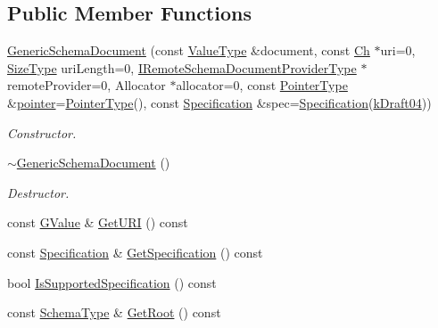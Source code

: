 \subsection*{Public Member Functions}
\begin{DoxyCompactItemize}
\item 
\hyperlink{classGenericSchemaDocument_a00e74506bb3da4e1c82b62c955f717f6}{Generic\+Schema\+Document} (const \hyperlink{classGenericSchemaDocument_ae246f1b6573a5a8a2c0d73d4eb64d53a}{Value\+Type} \&document, const \hyperlink{classGenericSchemaDocument_ab1dec56a78b29649eb8e4b85b101ec7c}{Ch} $\ast$uri=0, \hyperlink{rapidjson_8h_a5ed6e6e67250fadbd041127e6386dcb5}{Size\+Type} uri\+Length=0, \hyperlink{classGenericSchemaDocument_aa53ca323efce50f88aea6fa0d03e9785}{I\+Remote\+Schema\+Document\+Provider\+Type} $\ast$remote\+Provider=0, Allocator $\ast$allocator=0, const \hyperlink{classGenericSchemaDocument_aeb62f562d4dc024402b00f97cbcef747}{Pointer\+Type} \&\hyperlink{imgui__impl__opengl3__loader_8h_aae1f8d263916ad71bd415381591549c0}{pointer}=\hyperlink{classGenericSchemaDocument_aeb62f562d4dc024402b00f97cbcef747}{Pointer\+Type}(), const \hyperlink{structSpecification}{Specification} \&spec=\hyperlink{structSpecification}{Specification}(\hyperlink{schema_8h_a9804f9d7d7bd63131facb12bbeed41a9aa83888819bf813bd89c4c50f8c3275e4}{k\+Draft04}))
\begin{DoxyCompactList}\small\item\em Constructor. \end{DoxyCompactList}\item 
\hyperlink{classGenericSchemaDocument_a6a54dfd1aec0f560f7e47e08f3fcb8f1}{$\sim$\+Generic\+Schema\+Document} ()
\begin{DoxyCompactList}\small\item\em Destructor. \end{DoxyCompactList}\item 
const \hyperlink{classGenericSchemaDocument_a777505b09fff6cf23b8cfed9e0350eec}{G\+Value} \& \hyperlink{classGenericSchemaDocument_a9cec414e479ff5ce2917eb48e53d46b4}{Get\+U\+RI} () const
\item 
const \hyperlink{structSpecification}{Specification} \& \hyperlink{classGenericSchemaDocument_a88b62382579b70f769f95de5474a59b1}{Get\+Specification} () const
\item 
bool \hyperlink{classGenericSchemaDocument_ad4869fab7911c5680a2aedc7f6a6b1c0}{Is\+Supported\+Specification} () const
\item 
const \hyperlink{classGenericSchemaDocument_acaf115202b159a2eb72c97c3dc6c3895}{Schema\+Type} \& \hyperlink{classGenericSchemaDocument_a3b86ad6eab393014cc5b3c52da5c4bc2}{Get\+Root} () const

\end{DoxyCompactItemize}
